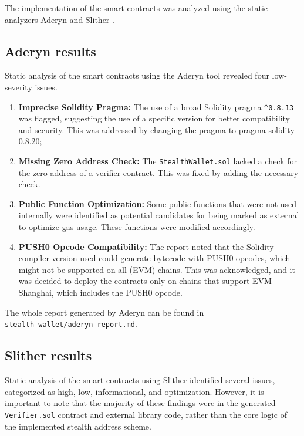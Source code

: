 The implementation of the smart contracts was analyzed using the static analyzers
Aderyn \cite{githubCyfrinaderyn} and Slither \cite{githubCryticslither}.

\subsection{Aderyn results}

Static analysis of the smart contracts using the Aderyn tool revealed four low-severity issues.

\begin{enumerate}
    \item \textbf{Imprecise Solidity Pragma:} The use of a broad Solidity
        pragma \texttt{\textasciicircum0.8.13} was flagged, suggesting the use of a specific version for
        better compatibility and security. This was addressed by changing the
        pragma to pragma solidity 0.8.20;
    \item \textbf{Missing Zero Address Check:} The \texttt{StealthWallet.sol}
        lacked a check for the zero address of a verifier contract. This was
        fixed by adding the necessary check.
    \item \textbf{Public Function Optimization:} Some public functions that
        were not used internally were identified as potential candidates for being
        marked as external to optimize gas usage. These functions were modified
        accordingly.
    \item \textbf{PUSH0 Opcode Compatibility:} The report noted that the
        Solidity compiler version used could generate bytecode with PUSH0 opcodes,
        which might not be supported on all (EVM) chains.
        This was acknowledged, and it was decided to deploy the contracts only on
        chains that support EVM Shanghai, which includes the PUSH0 opcode.
\end{enumerate}

The whole report generated by Aderyn can be found in\\\texttt{stealth-wallet/aderyn-report.md}.

\subsection{Slither results}

Static analysis of the smart contracts using Slither identified several
issues, categorized as high, low, informational, and optimization.
However, it is important to note that the majority of these findings were in the
generated \texttt{Verifier.sol} contract and external library code, rather
than the core logic of the implemented stealth address scheme.

